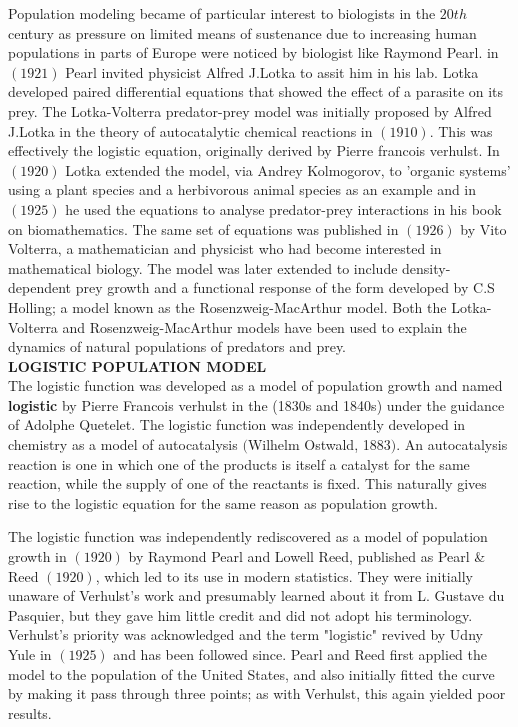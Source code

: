 \documentclass[a4paper,12pt]{report}
\numberwithin{equation}{section}
\begin{document}
\indent Population modeling became of particular interest to biologists in the $20th$ century as pressure on limited means of sustenance due to increasing human populations in parts of Europe were noticed by biologist like Raymond Pearl. in $(1921)$ Pearl invited physicist Alfred J.Lotka to assit him in his lab. Lotka developed paired differential equations that showed the effect of a parasite on its prey. 
The Lotka-Volterra predator-prey model was initially proposed by Alfred J.Lotka in the theory of autocatalytic chemical reactions in $(1910)$. This was effectively the logistic equation, originally derived by Pierre francois verhulst. In $(1920)$ Lotka extended the model, via Andrey Kolmogorov, to    'organic systems' using a plant species and a herbivorous animal species as an example and in $(1925)$ he used the equations to analyse predator-prey interactions in his book on biomathematics. The same set of equations was published in $(1926)$ by Vito Volterra, a mathematician and physicist who had become interested in mathematical biology. The model was later extended to include density-dependent prey growth and a functional response of the form developed by C.S Holling; a model known as the Rosenzweig-MacArthur model. Both the Lotka-Volterra and Rosenzweig-MacArthur models have been used to explain the dynamics of natural populations of predators and prey.\\

\newpage
\textbf{LOGISTIC POPULATION MODEL}\\
The logistic function was developed as a model of population growth and named \textbf{logistic} by Pierre Francois verhulst in the (1830s and 1840s) under the guidance of Adolphe Quetelet. The logistic function was independently developed in chemistry as a model of autocatalysis $($Wilhelm Ostwald, 1883$)$. An autocatalysis reaction is one in which one of the products is itself a catalyst for the same reaction, while the supply of one of the reactants is fixed. This naturally gives rise to the logistic equation for the same reason as population growth.

The logistic function was independently rediscovered as a model of population growth in $(1920)$ by Raymond Pearl and Lowell Reed, published as Pearl \& Reed $(1920)$, which led to its use in modern statistics.  They were initially unaware of Verhulst's work and presumably learned about it from L. Gustave du Pasquier, but they gave him little credit and did not adopt his terminology. Verhulst's priority was acknowledged and the term "logistic" revived by Udny Yule in $(1925)$ and has been followed since. Pearl and Reed first applied the model to the population of the United States, and also initially fitted the curve by making it pass through three points; as with Verhulst, this again yielded poor results.
\end{document}
